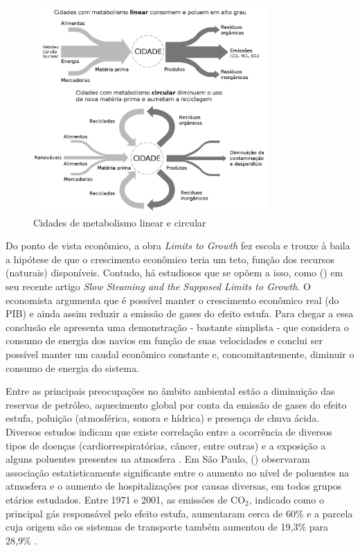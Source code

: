 \begin{figure}[htb]%
    \caption{\label{fig:cidade-metabolismos}Cidades de metabolismo linear e circular}%
    \begin{center}%
        \includegraphics[width=0.80\textwidth]{./imagens/richard-linear-circular.jpg}%
    \end{center}%
\end{figure}%

Do ponto de vista econômico, a obra \emph{Limits to Growth} fez escola e trouxe à baila a hipótese de que o crescimento econômico teria um teto, função dos recursos (naturais) disponíveis. Contudo, há estudiosos que se opõem a isso, como  (\citeyear{KRUGMAN2014}) em seu recente artigo \emph{Slow Steaming and the Supposed Limits to Growth}. O economista argumenta que é possível manter o crescimento econômico real (do PIB) e ainda assim reduzir a emissão de gases do efeito estufa. Para chegar a essa conclusão ele apresenta uma demonstração - bastante simplista - que considera o consumo de energia dos navios em função de suas velocidades e conclui ser possível manter um caudal econômico constante e, concomitantemente, diminuir o consumo de energia do sistema.

Entre as principais preocupações no âmbito ambiental estão a diminuição das reservas de petróleo, aquecimento global por conta da emissão de gases do efeito estufa, poluição (atmosférica, sonora e hídrica) e presença de chuva ácida. Diversos estudos indicam que existe correlação entre a ocorrência de diversos tipos de doenças (cardiorrespiratórias, câncer, entre outras) e a exposição a alguns poluentes presentes na atmosfera \cite{WHO2000,WHO2006,BRUNEKREEF2012,MIRANDA2012}. Em São Paulo,  (\citeyear{GOUVEIA2006}) observaram associação estatisticamente significante entre o aumento no nível de poluentes na atmosfera e o aumento de hospitalizações por causas diversas, em todos grupos etários estudados. Entre 1971 e 2001, as emissões de CO$_2$, indicado como o principal gás responsável pelo efeito estufa, aumentaram cerca de 60\% e a parcela cuja origem são os sistemas de transporte também aumentou de 19,3\% para 28,9\% \cite{BANISTER2005}.


